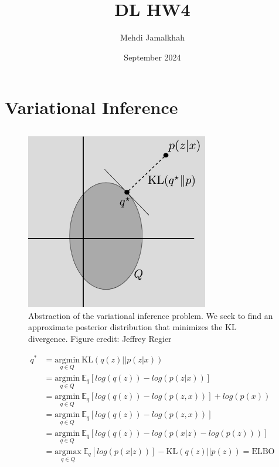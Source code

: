 \documentclass{article}
\title{DL HW4}
\author{Mehdi Jamalkhah}
\date{September 2024}
\newcommand*{\ex}[1]{
    \mathbb{E}_{#1}
}
\begin{document}
\maketitle
\section{Variational Inference}


\subsection{}

\begin{figure}[H]
    \begin{center}
        \includegraphics[width=8cm]{figures/VI.png}
    \end{center}
    \caption{Abstraction of the variational inference problem. We seek to find an approximate posterior distribution that minimizes the KL divergence. Figure credit: Jeffrey Regier}
\end{figure}
\begin{align*}
    q^*
    &= \underset{q \in Q}{\text{argmin}} \ \text{KL}(q(z)||p(z|x))\\
    &= \underset{q \in Q}{\text{argmin}} \ \ex{q}[log(q(z)) - log(p(z|x))]\\
    &= \underset{q \in Q}{\text{argmin}} \ \ex{q}[log(q(z)) - log(p(z,x))] + log(p(x))\\
    &= \underset{q \in Q}{\text{argmin}} \ \ex{q}[log(q(z)) - log(p(z,x))]\\
    &= \underset{q \in Q}{\text{argmin}} \ \ex{q}[log(q(z)) - log(p(x|z) - log(p(z)))]\\
    &= \underset{q \in Q}{\text{argmax}} \ \ex{q}[log(p(x|z))] - \text{KL}(q(z)||p(z)) = \text{ELBO}\\ 
\end{align*}
\end{document}
